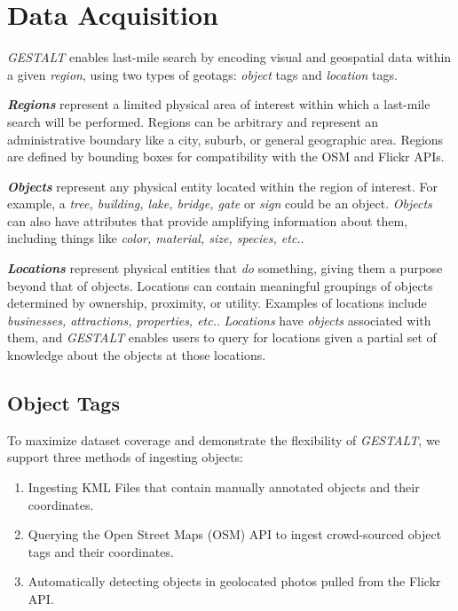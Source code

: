 \section{Data Acquisition}
\label{section:data}

\emph{GESTALT} enables last-mile search by encoding visual and geospatial data within a given \emph{region}, using two types of geotags: \emph{object} tags and \emph{location} tags.

\textbf{\emph{Regions}} represent a limited physical area of interest within which a last-mile search will be performed. 
Regions can be arbitrary and represent an administrative boundary like a city, suburb, or general geographic area.
Regions are defined by bounding boxes for compatibility with the OSM and Flickr APIs.

\textbf{\emph{Objects}} represent any physical entity located within the region of interest. 
For example, a \textit{tree, building, lake, bridge, gate} or \textit{sign} could be an object. 
\textit{Objects} can also have attributes that provide amplifying information about them, including things like \textit{color, material, size, species, etc.}. 

\textbf{\emph{Locations}} represent physical entities that \textit{do} something, giving them a purpose beyond that of objects. 
Locations can contain meaningful groupings of objects determined by ownership, proximity, or utility. 
Examples of locations include \textit{businesses, attractions, properties, etc.}. 
\textit{Locations} have \textit{objects} associated with them, and \emph{GESTALT} enables users to query for locations given a partial set of knowledge about the objects at those locations.

\subsection{Object Tags}
To maximize dataset coverage and demonstrate the flexibility of \emph{GESTALT}, we support three methods of ingesting objects:
\begin{enumerate}
    \item Ingesting KML Files that contain manually annotated objects and their coordinates.
    \item Querying the Open Street Maps (OSM) API to ingest crowd-sourced object tags and their coordinates.
    \item Automatically detecting objects in geolocated photos pulled from the Flickr API. 
\end{enumerate}


